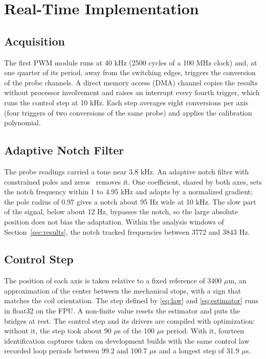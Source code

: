\documentclass[conference]{IEEEtran}
\begin{document}
\section{Real-Time Implementation}\label{sec:implementation}

\subsection{Acquisition}

The first PWM module runs at 40 kHz (2500 cycles of a 100 MHz clock) and, at one quarter of its period, away from the switching edges, triggers the conversion of the probe channels. A direct memory access (DMA) channel copies the results without processor involvement and raises an interrupt every fourth trigger, which runs the control step at 10 kHz. Each step averages eight conversions per axis (four triggers of two conversions of the same probe) and applies the calibration polynomial.

\subsection{Adaptive Notch Filter}

The probe readings carried a tone near 3.8 kHz. An adaptive notch filter with constrained poles and zeros~\cite{nehorai1985minimal} removes it. One coefficient, shared by both axes, sets the notch frequency within 1 to 4.95 kHz and adapts by a normalized gradient; the pole radius of 0.97 gives a notch about 95 Hz wide at 10 kHz. The slow part of the signal, below about 12 Hz, bypasses the notch, so the large absolute position does not bias the adaptation. Within the analysis windows of Section~\ref{sec:results}, the notch tracked frequencies between 3772 and 3843 Hz.

\subsection{Control Step}

The position of each axis is taken relative to a fixed reference of 3400 $\mu$m, an approximation of the center between the mechanical stops, with a sign that matches the coil orientation. The step defined by \eqref{eq:law} and \eqref{eq:estimator} runs in float32 on the FPU. A non-finite value resets the estimator and puts the bridges at rest. The control step and its drivers are compiled with optimization: without it, the step took about 90 $\mu$s of the 100 $\mu$s period. With it, fourteen identification captures taken on development builds with the same control law recorded loop periods between 99.2 and 100.7 $\mu$s and a longest step of 31.9 $\mu$s.
\end{document}

